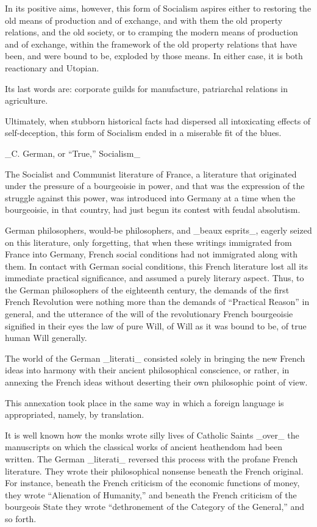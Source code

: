 In its positive aims, however, this form of Socialism aspires either to
restoring the old means of production and of exchange, and with them
the old property relations, and the old society, or to cramping the
modern means of production and of exchange, within the framework of the
old property relations that have been, and were bound to be, exploded
by those means. In either case, it is both reactionary and Utopian.

Its last words are: corporate guilds for manufacture, patriarchal
relations in agriculture.

Ultimately, when stubborn historical facts had dispersed all
intoxicating effects of self-deception, this form of Socialism ended in
a miserable fit of the blues.

_C. German, or “True,” Socialism_


The Socialist and Communist literature of France, a literature that
originated under the pressure of a bourgeoisie in power, and that was
the expression of the struggle against this power, was introduced into
Germany at a time when the bourgeoisie, in that country, had just begun
its contest with feudal absolutism.

German philosophers, would-be philosophers, and _beaux esprits_,
eagerly seized on this literature, only forgetting, that when these
writings immigrated from France into Germany, French social conditions
had not immigrated along with them. In contact with German social
conditions, this French literature lost all its immediate practical
significance, and assumed a purely literary aspect. Thus, to the German
philosophers of the eighteenth century, the demands of the first French
Revolution were nothing more than the demands of “Practical Reason” in
general, and the utterance of the will of the revolutionary French
bourgeoisie signified in their eyes the law of pure Will, of Will as it
was bound to be, of true human Will generally.

The world of the German _literati_ consisted solely in bringing the new
French ideas into harmony with their ancient philosophical conscience,
or rather, in annexing the French ideas without deserting their own
philosophic point of view.

This annexation took place in the same way in which a foreign language
is appropriated, namely, by translation.

It is well known how the monks wrote silly lives of Catholic Saints
_over_ the manuscripts on which the classical works of ancient
heathendom had been written. The German _literati_ reversed this
process with the profane French literature. They wrote their
philosophical nonsense beneath the French original. For instance,
beneath the French criticism of the economic functions of money, they
wrote “Alienation of Humanity,” and beneath the French criticism of the
bourgeois State they wrote “dethronement of the Category of the
General,” and so forth.

